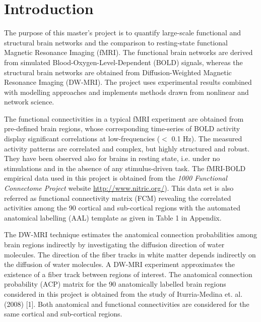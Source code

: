 
\chapter{Introduction} %

\label{Chapter1} %





The purpose of this master's project is to quantify large-scale functional and structural brain networks and the comparison to resting-state functional Magnetic Resonance Imaging (fMRI). The functional brain networks are derived from simulated Blood-Oxygen-Level-Dependent (BOLD) signals, whereas the structural brain networks are obtained from Diffusion-Weighted Magnetic Resonance Imaging (DW-MRI). The project uses experimental results combined with modelling approaches and implements methods drawn from nonlinear and network science. 

The functional connectivities in a typical fMRI experiment are obtained from pre-defined brain regions, whose corresponding time-series of BOLD activity display significant correlations at low-frequencies ($<$ 0.1 Hz). The measured activity patterns are correlated and complex, but highly structured and robust. They have been observed also for brains in resting state, i.e. under no stimulations and in the absence of any stimulus-driven task. The fMRI-BOLD empirical data used in this project is obtained from the \textit{1000 Functional Connectome Project} website \url{http://www.nitric.org/}).  
This data set is also referred as functional connectivity matrix (FCM) revealing the correlated activities among the 90 cortical and sub-cortical regions with the automated anatomical labelling (AAL) template as given in Table 1 in Appendix.

The DW-MRI technique estimates the anatomical connection probabilities among brain regions indirectly by investigating the diffusion direction of water molecules. The direction of the fiber tracks in white matter depends indirectly on the diffusion of water molecules. A DW-MRI experiment approximates the existence of a fiber track between regions of interest. The anatomical connection probability (ACP) matrix for the 90 anatomically labelled brain regions considered in this project is obtained from the study of Iturria-Medina et. al. (2008) [1]. Both anatomical and functional connectivities are considered for the same cortical and sub-cortical regions. 

